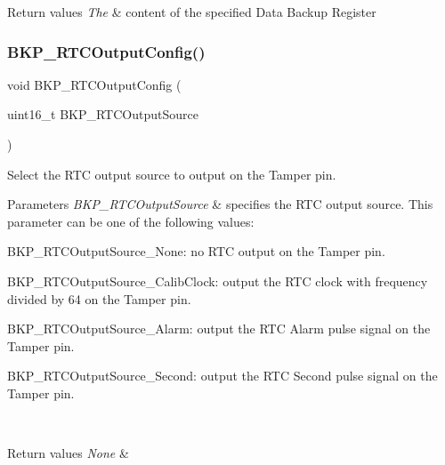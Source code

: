 \begin{DoxyRetVals}{Return values}
{\em The} & content of the specified Data Backup Register \\
\hline
\end{DoxyRetVals}
\mbox{\label{group___b_k_p___private___functions_ga3d1b22b3c6a79f7b423616a0af1885bf}} 
\subsubsection{\texorpdfstring{BKP\_RTCOutputConfig()}{BKP\_RTCOutputConfig()}}
{\footnotesize\ttfamily void B\+K\+P\+\_\+\+R\+T\+C\+Output\+Config (\begin{DoxyParamCaption}\item[{uint16\+\_\+t}]{B\+K\+P\+\_\+\+R\+T\+C\+Output\+Source }\end{DoxyParamCaption})}



Select the R\+TC output source to output on the Tamper pin. 


\begin{DoxyParams}{Parameters}
{\em B\+K\+P\+\_\+\+R\+T\+C\+Output\+Source} & specifies the R\+TC output source. This parameter can be one of the following values\+: \begin{DoxyItemize}
\item B\+K\+P\+\_\+\+R\+T\+C\+Output\+Source\+\_\+\+None\+: no R\+TC output on the Tamper pin. \item B\+K\+P\+\_\+\+R\+T\+C\+Output\+Source\+\_\+\+Calib\+Clock\+: output the R\+TC clock with frequency divided by 64 on the Tamper pin. \item B\+K\+P\+\_\+\+R\+T\+C\+Output\+Source\+\_\+\+Alarm\+: output the R\+TC Alarm pulse signal on the Tamper pin. \item B\+K\+P\+\_\+\+R\+T\+C\+Output\+Source\+\_\+\+Second\+: output the R\+TC Second pulse signal on the Tamper pin.\end{DoxyItemize}
\\
\hline
\end{DoxyParams}

\begin{DoxyRetVals}{Return values}
{\em None} & \\
\hline
\end{DoxyRetVals}
\mbox{\label{group___b_k_p___private___functions_gad34db08a944450d2e7d56d0fd8db2bca}} 
